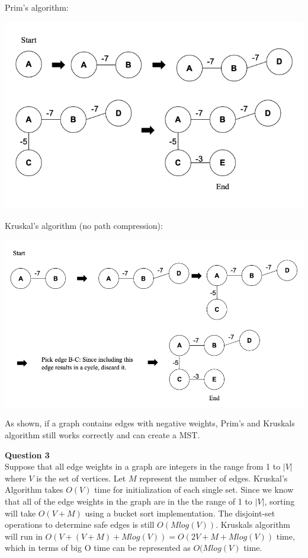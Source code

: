\documentclass{article}
\begin{document}
Prim's algorithm:
\begin{center}
    \includegraphics[width=1\textwidth]{4-1.png}
\end{center}

Kruskal's algorithm (no path compression):
\begin{center}
    \includegraphics[width=1\textwidth]{4-2.png}
\end{center}

As shown, if a graph contains edges with negative weights, Prim's and Kruskals algorithm still works correctly and can create a MST.

\bigskip
{\bf Question 3}\\
Suppose that all edge weights in a graph are integers in the range from 1 to $|V|$ where $V$ is the set of vertices. Let $M$ represent the number of edges. Kruskal's Algorithm takes $O(V)$ time for initialization of each single set. Since we know that all of the edge weights in the graph are in the the range of 1 to $|V|$, sorting will take $O(V + M)$ using a bucket sort implementation. The disjoint-set operations to determine safe edges is still $O(Mlog(V))$. Kruskals algorithm will run in $O(V+(V+M)+Mlog(V))=O(2V+M+Mlog(V))$ time, which in terms of big O time can be represented as $O(Mlog(V)$ time.
\end{document}
